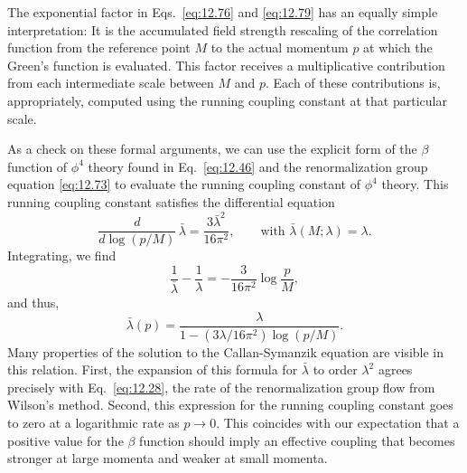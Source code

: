 The exponential factor in Eqs.~\eqref{eq:12.76} and \eqref{eq:12.79} has an
equally simple interpretation: It is the accumulated field strength rescaling
of the correlation function from the reference point $M$ to the actual
momentum $p$ at which the Green's function is evaluated.  This factor
receives a multiplicative contribution from each intermediate scale between
$M$ and $p$.  Each of these contributions is, appropriately, computed using
the running coupling constant at that particular scale.

As a check on these formal arguments, we can use the explicit form of the
$\beta$ function of $\phi^4$ theory found in Eq.~\eqref{eq:12.46} and the
renormalization group equation \eqref{eq:12.73} to evaluate the running
coupling constant of $\phi^4$ theory.  This running coupling constant
satisfies the differential equation
\begin{equation}
  \frac{d}{d\log(p/M)}\,\bar{\lambda} = \frac{3\bar{\lambda}^2}{16\pi^2},
  \qquad\text{with } \bar{\lambda}(M;\lambda) = \lambda .
  \label{eq:12.81}
\end{equation}
Integrating, we find
\begin{equation}
  \frac{1}{\bar{\lambda}} - \frac{1}{\lambda} = -\frac{3}{16\pi^2}\log
    \frac{p}{M},
\end{equation}
and thus,
\begin{equation}
  \bar{\lambda}(p) = \frac{\lambda}{1 - (3\lambda/16\pi^2)\log(p/M)} .
  \label{eq:12.82}
\end{equation}
Many properties of the solution to the Callan-Symanzik equation are visible
in this relation.  First, the expansion of this formula for $\bar{\lambda}$ to
order $\lambda^2$ agrees precisely with Eq.~\eqref{eq:12.28}, the rate of the
renormalization group flow from Wilson's method.  Second, this expression for
the running coupling constant goes to zero at a logarithmic rate as $p\to 0$.
This coincides with our expectation that a positive value for the $\beta$
function should imply an effective coupling that becomes stronger at large
momenta and weaker at small momenta.

